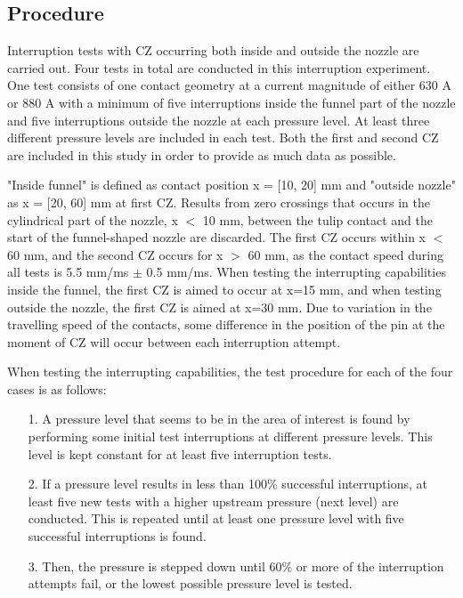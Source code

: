 \documentclass[10pt,a4paper,twoside]{article}
\begin{document}
\newpage
\subsection{Procedure}
Interruption tests with CZ occurring both inside and outside the nozzle are carried out. Four tests in total are conducted in this interruption experiment. One test consists of one contact geometry at a current magnitude of either 630 A or 880 A with a minimum of five interruptions inside the funnel part of the nozzle and five interruptions outside the nozzle at each pressure level. At least three different pressure levels are included in each test. Both the first and second CZ are included in this study in order to provide as much data as possible.

"Inside funnel" is defined as contact position x = [10, 20] mm and "outside nozzle" as x = [20, 60] mm at first CZ. Results from zero crossings that occurs in the cylindrical part of the nozzle, x $<$ 10 mm, between the tulip contact and the start of the funnel-shaped nozzle are discarded. The first CZ occurs within x $<$ 60 mm, and the second CZ occurs for x $>$ 60 mm, as the contact speed during all tests is 5.5 mm/ms $\pm$ 0.5 mm/ms. When testing the interrupting capabilities inside the funnel, the first CZ is aimed to occur at x=15 mm, and when testing outside the nozzle, the first CZ is aimed at x=30 mm. Due to variation in the travelling speed of the contacts, some difference in the position of the pin at the moment of CZ will occur between each interruption attempt.

When testing the interrupting capabilities, the test procedure for each of the four cases is as follows: 

\begin{itemize}
\item[1.] A pressure level that seems to be in the area of interest is found by performing some initial test interruptions at different pressure levels. This level is kept constant for at least five interruption tests.
\item[2.] If a pressure level results in less than 100\% successful interruptions, at least five new tests with a higher upstream pressure (next level) are conducted. This is repeated until at least one pressure level with five successful interruptions is found.
\item[3.] Then, the pressure is stepped down until 60\% or more of the interruption attempts fail, or the lowest possible pressure level is tested.
\end{itemize}
\end{document}
